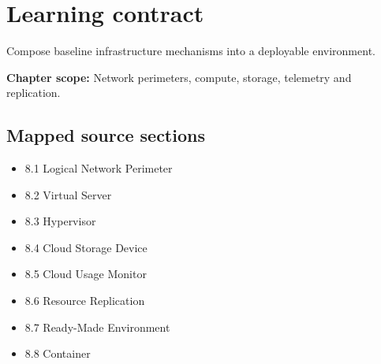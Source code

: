 \documentclass[10pt,letterpaper]{article}
\begin{document}
\sourceStatement
\tableofcontents
\newpage
\section{Learning contract}
\begin{takeaway}
Compose baseline infrastructure mechanisms into a deployable environment.
\end{takeaway}
\textbf{Chapter scope:} Network perimeters, compute, storage, telemetry and replication.\\
\subsection{Mapped source sections}
\begin{itemize}
\item 8.1 Logical Network Perimeter
\item 8.2 Virtual Server
\item 8.3 Hypervisor
\item 8.4 Cloud Storage Device
\item 8.5 Cloud Usage Monitor
\item 8.6 Resource Replication
\item 8.7 Ready-Made Environment
\item 8.8 Container
\end{itemize}
\end{document}
